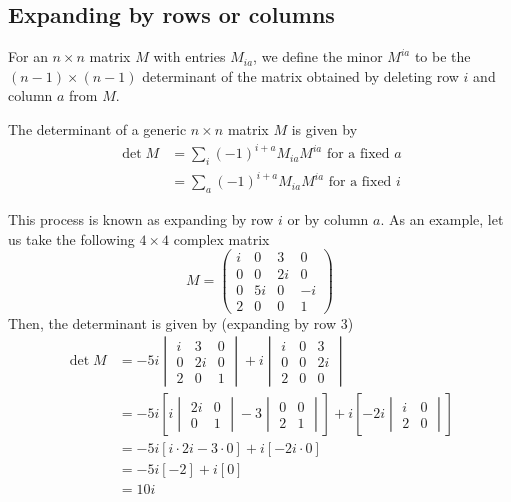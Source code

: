 \subsection{Expanding by rows or columns}
For an \(n \times n\) matrix \(M\) with entries \(M_{ia}\), we define the minor \(M^{ia}\) to be the \((n-1)\times(n-1)\) determinant of the matrix obtained by deleting row \(i\) and column \(a\) from \(M\).
\begin{proposition}
	The determinant of a generic \(n \times n\) matrix \(M\) is given by
	\begin{align*}
		\det M
		 & = \sum_i (-1)^{i+a} M_{ia} M^{ia} \text{ for a fixed \(a\)} \\
		 & = \sum_a (-1)^{i+a} M_{ia} M^{ia} \text{ for a fixed \(i\)}
	\end{align*}
\end{proposition}
This process is known as expanding by row \(i\) or by column \(a\).
As an example, let us take the following \(4 \times 4\) complex matrix
\[
	M = \begin{pmatrix}
		i & 0  & 3  & 0  \\
		0 & 0  & 2i & 0  \\
		0 & 5i & 0  & -i \\
		2 & 0  & 0  & 1
	\end{pmatrix}
\]
Then, the determinant is given by (expanding by row 3)
\begin{align*}
	\det M
	 & = -5i\begin{vmatrix}
		i & 3  & 0 \\
		0 & 2i & 0 \\
		2 & 0  & 1
	\end{vmatrix} + i\begin{vmatrix}
		i & 0 & 3  \\
		0 & 0 & 2i \\
		2 & 0 & 0
	\end{vmatrix}                                                               \\
	 & = -5i\left[i\begin{vmatrix}
			2i & 0 \\
			0  & 1
		\end{vmatrix} - 3 \begin{vmatrix}
			0 & 0 \\
			2 & 1
		\end{vmatrix}\right] + i\left[-2i\begin{vmatrix}
			i & 0 \\
			2 & 0
		\end{vmatrix}\right] \\
	 & = -5i[i \cdot 2i - 3 \cdot 0] + i[-2i \cdot 0]                                                                             \\
	 & = -5i[-2] + i[0]                                                                                                           \\
	 & = 10i
\end{align*}

